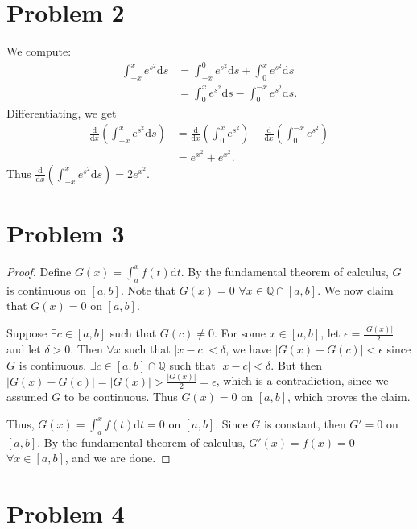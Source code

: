 \documentclass{article}
\newcommand{\Q}{\mathbb{Q}} %
\begin{document}
\section*{Problem 2}
We compute:
\begin{align}
	\int_{-x}^x e^{s^2} \mathrm{d}s &= \int_{-x}^{0}e^{s^2} \mathrm{d}s + \int_{0}^{x}e^{s^2} \mathrm{d}s \\
	&= \int_{0}^{x}e^{s^2} \mathrm{d}s - \int_{0}^{-x}e^{s^2} \mathrm{d}s.
\end{align}
Differentiating, we get
\begin{align}
	\frac{\mathrm{d}}{\mathrm{d}x}\left(\int_{-x}^x e^{s^2} \mathrm{d}s\right) &= \frac{\mathrm{d}}{\mathrm{d}x}\left(\int_{0}^{x}e^{s^2}\right) - \frac{\mathrm{d}}{\mathrm{d}x}\left(\int_{0}^{-x}e^{s^2}\right) \\
	&= e^{x^2} + e^{x^2}.
\end{align}
Thus $\frac{\mathrm{d}}{\mathrm{d}x}\left(\int_{-x}^x e^{s^2} \mathrm{d}s\right) = 2e^{x^2}$.
\section*{Problem 3}
\begin{proof}
	Define $G(x) = \int_a ^x f(t) \mathrm{d}t$. By the fundamental theorem of calculus, $G$ is continuous on $[a, b]$. Note that $G(x) = 0$  $\forall x \in \Q \cap [a, b]$. We now claim that $G(x) = 0$ on $[a, b]$. 
	
	Suppose $\exists c \in [a, b]$ such that $G(c) \neq 0$. For some $x \in [a, b]$, let $\epsilon = \frac{|G(x)|}{2}$ and let $\delta > 0$. Then $\forall x$ such that $|x - c| < \delta$, we have $|G(x) - G(c)| < \epsilon$ since $G$ is continuous. $\exists c \in [a, b] \cap \Q$ such that $|x - c| < \delta$. But then $|G(x) - G(c)| = |G(x)| > \frac{|G(x)|}{2} = \epsilon$, which is a contradiction, since we assumed $G$ to be continuous. Thus $G(x) = 0$ on $[a, b]$, which proves the claim.
	
	Thus, $G(x) = \int_a ^x f(t) \mathrm{d}t = 0$ on $[a, b]$. Since $G$ is constant, then $G' = 0$ on $[a, b]$. By the fundamental theorem of calculus, $G'(x) = f(x) = 0$ $\forall x \in [a, b]$, and we are done.
\end{proof}
\section*{Problem 4}
\end{document}
